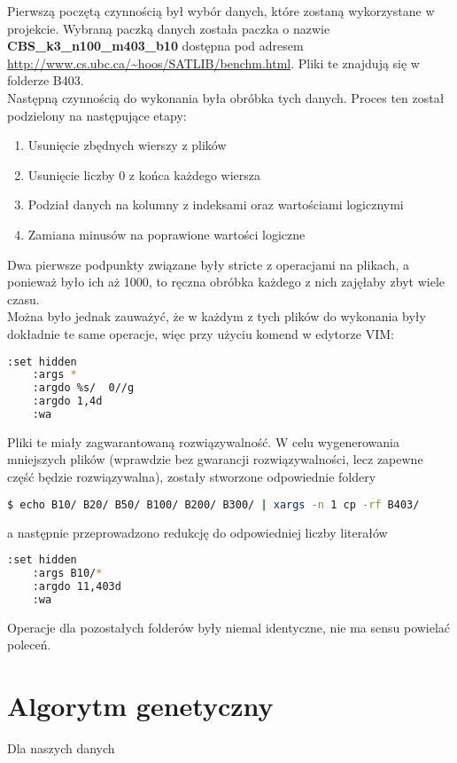 \documentclass[11pt]{article}
\theoremstyle{note}
\begin{document}
Pierwszą poczętą czynnością był wybór danych, które zostaną wykorzystane w projekcie. Wybraną paczką danych została paczka o nazwie \textbf{CBS\_k3\_n100\_m403\_b10} dostępna pod adresem \url{http://www.cs.ubc.ca/~hoos/SATLIB/benchm.html}. Pliki te znajdują się w folderze B403. \\
Następną czynnością do wykonania była obróbka tych danych. Proces ten został podzielony na następujące etapy:
\begin{enumerate}
  \item Usunięcie zbędnych wierszy z plików
  \item Usunięcie liczby 0 z końca każdego wiersza
  \item Podział danych na kolumny z indeksami oraz wartościami logicznymi
  \item Zamiana minusów na poprawione wartości logiczne
\end{enumerate}

Dwa pierwsze podpunkty związane były stricte z operacjami na plikach, a ponieważ było ich aż 1000, to ręczna obróbka każdego z nich zajęłaby zbyt wiele czasu. \\
Można było jednak zauważyć, że w każdym z tych plików do wykonania były dokładnie te same operacje, więc przy użyciu komend w edytorze VIM:
\begin{lstlisting}[language=bash]
	:set hidden
	:args *
	:argdo %s/  0//g
	:argdo 1,4d
	:wa
\end{lstlisting}

\noindent Pliki te miały zagwarantowaną rozwiązywalność. W celu wygenerowania mniejszych plików (wprawdzie bez gwarancji rozwiązywalności, lecz zapewne część będzie rozwiązywalna), zostały stworzone odpowiednie foldery
\begin{lstlisting}[language=bash]
$ echo B10/ B20/ B50/ B100/ B200/ B300/ | xargs -n 1 cp -rf B403/
\end{lstlisting}
a następnie przeprowadzono redukcję do odpowiedniej liczby literałów
\begin{lstlisting}[language=bash]
	:set hidden
	:args B10/*
	:argdo 11,403d
	:wa
\end{lstlisting}
Operacje dla pozostałych folderów były niemal identyczne, nie ma sensu powielać poleceń.
\newpage
\section{Algorytm genetyczny}
Dla naszych danych 
\end{document}
